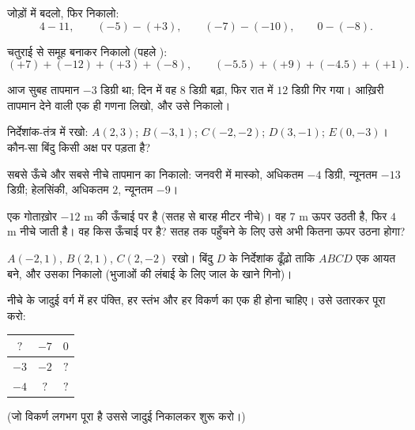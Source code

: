 \begin{exercise}[$\star$]\label{exo:g7:negatives:5}
जोड़ों में बदलो, फिर निकालो:
\[
4 - 11, \qquad
(-5) - (+3), \qquad
(-7) - (-10), \qquad
0 - (-8).
\]
\end{exercise}

\begin{exercise}[$\star$]\label{exo:g7:negatives:6}
चतुराई से समूह बनाकर निकालो (पहले ):
\[
(+7) + (-12) + (+3) + (-8), \qquad
(-5.5) + (+9) + (-4.5) + (+1).
\]
\end{exercise}

\begin{exercise}[$\star$]\label{exo:g7:negatives:7}
आज सुबह तापमान $-3$ डिग्री था; दिन में वह $8$ डिग्री बढ़ा, फिर
रात में $12$ डिग्री गिर गया। आख़िरी तापमान देने वाली एक ही गणना
लिखो, और उसे निकालो।
\end{exercise}

\begin{exercise}[$\star$]\label{exo:g7:negatives:8}
निर्देशांक-तंत्र में रखो: $A(2, 3)$; $B(-3, 1)$; $C(-2, -2)$;
$D(3, -1)$; $E(0, -3)$। कौन-सा बिंदु किसी अक्ष पर पड़ता है?
\end{exercise}

\begin{exercise}[$\star\star$]\label{exo:g7:negatives:9}
सबसे ऊँचे और सबसे नीचे तापमान का  निकालो:
जनवरी में मास्को, अधिकतम $-4$ डिग्री, न्यूनतम $-13$ डिग्री;
हेलसिंकी, अधिकतम $2$, न्यूनतम $-9$।
\end{exercise}

\begin{exercise}[$\star\star$]\label{exo:g7:negatives:10}
एक गोताख़ोर $-12$ m की ऊँचाई पर है (सतह से बारह मीटर नीचे)। वह
$7$ m ऊपर उठती है, फिर $4$ m नीचे जाती है। वह किस ऊँचाई पर है?
सतह तक पहुँचने के लिए उसे अभी कितना ऊपर उठना होगा?
\end{exercise}

\begin{exercise}[$\star\star$]\label{exo:g7:negatives:11}
$A(-2, 1)$, $B(2, 1)$, $C(2, -2)$ रखो। बिंदु $D$ के निर्देशांक
ढूँढ़ो ताकि $ABCD$ एक आयत बने, और उसका  निकालो
(भुजाओं की लंबाई के लिए जाल के खाने गिनो)।
\end{exercise}

\begin{exercise}[$\star\star\star$]\label{exo:g7:negatives:12}
नीचे के जादुई वर्ग में हर पंक्ति, हर स्तंभ और हर विकर्ण का 
एक ही होना चाहिए। उसे उतारकर पूरा करो:
\begin{center}
\renewcommand{\arraystretch}{1.4}
\begin{tabular}{|c|c|c|}
\hline
$?$ & $-7$ & $0$ \\
\hline
$-3$ & $-2$ & $?$ \\
\hline
$-4$ & $?$ & $?$ \\
\hline
\end{tabular}
\end{center}
(जो विकर्ण लगभग पूरा है उससे जादुई  निकालकर
शुरू करो।)
\end{exercise}

